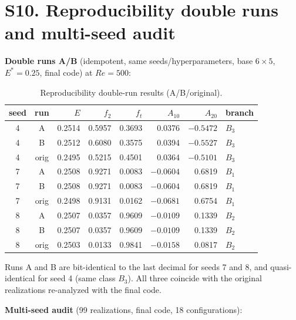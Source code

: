 \documentclass[11pt]{article}
\begin{document}
\section{S10. Reproducibility double runs and multi-seed audit}
\label{sec:S10}

\textbf{Double runs A/B} (idempotent, same seeds/hyperparameters, base $6\times5$,
$E^*=0.25$, final code) at $Re=500$:

\begin{table}[h]
\centering\small
\caption{Reproducibility double-run results (A/B/original).}
\label{tab:S10a}
\begin{tabular}{ccrrrrrl}
\toprule
seed & run & $E$ & $f_2$ & $f_t$ & $A_{10}$ & $A_{20}$ & branch\\
\midrule
4 & A & 0.2514 & 0.5957 & 0.3693 & 0.0376 & $-0.5472$ & $B_3$\\
4 & B & 0.2512 & 0.6080 & 0.3575 & 0.0394 & $-0.5527$ & $B_3$\\
4 & orig & 0.2495 & 0.5215 & 0.4501 & 0.0364 & $-0.5101$ & $B_3$\\
7 & A & 0.2508 & 0.9271 & 0.0083 & $-0.0604$ & 0.6819 & $B_1$\\
7 & B & 0.2508 & 0.9271 & 0.0083 & $-0.0604$ & 0.6819 & $B_1$\\
7 & orig & 0.2498 & 0.9131 & 0.0162 & $-0.0681$ & 0.6754 & $B_1$\\
8 & A & 0.2507 & 0.0357 & 0.9609 & $-0.0109$ & 0.1339 & $B_2$\\
8 & B & 0.2507 & 0.0357 & 0.9609 & $-0.0109$ & 0.1339 & $B_2$\\
8 & orig & 0.2503 & 0.0133 & 0.9841 & $-0.0158$ & 0.0817 & $B_2$\\
\bottomrule
\end{tabular}
\end{table}

Runs A and B are bit-identical to the last decimal for seeds 7 and 8, and
quasi-identical for seed 4 (same class $B_3$). All three coincide with the
original realizations re-analyzed with the final code.

\textbf{Multi-seed audit} (99 realizations, final code, 18 configurations):
\end{document}

